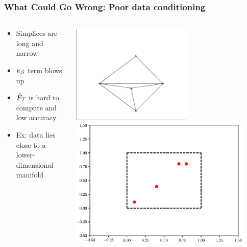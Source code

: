 \documentclass[aspectratio=169]{beamer}
\begin{document}
\begin{frame}\frametitle{What Could Go Wrong: Poor data conditioning}
\begin{columns}
\begin{column}{0.6\textwidth}
\begin{itemize}
\pause
\item Simplices are long and narrow
\item {\color{red} $\kappa_{\cal S}$ term blows up}
\item ${\hat F}_{\cal T}$ is hard to compute and low accuracy
\item Ex: data lies close to a lower-dimensional manifold
\end{itemize}
\end{column}
\begin{column}{0.4\textwidth}
\begin{center}
\includegraphics[width=0.6\textwidth]{triangleplane.eps}\\

\includegraphics[width=0.9\textwidth]{poor-condition-data.eps}
\end{center}
\end{column}
\end{columns}
\end{frame}
\end{document}
